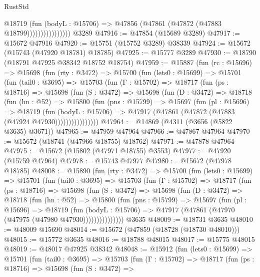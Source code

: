 \begin{lexlean}{RustStd}
\begin{coremodule}
                          @18719
                            (fun (bodyL : @15706) =>
                            @47856 (@47861 (@47872 (@47883 @18799))))))))))))))))
    @3289
@47916 := @47854 (@15689 @3289)
@47917 := @15672 @47916
@47920 := @15751 (@15752 @3289) @38339
@47924 := @15672 (@15743 (@47920 @18781) @18785)
@47925 := @15777 @3289
@47930 := @18790 (@18791 @47925 @38342 @18752 @18754)
@47959 := @15887
    (fun (rc : @15696) =>
    @15698
      (fun (rty : @3472) =>
      @15700
        (fun (lets0 : @15699) =>
        @15701
          (fun (tail0 : @3695) =>
          @15703
            (fun (Γ : @15702) =>
            @18717
              (fun (ps : @18716) =>
              @15698
                (fun (S : @3472) =>
                @15698
                  (fun (D : @3472) =>
                  @18718
                    (fun (hn : @52) =>
                    @15800
                      (fun (pns : @15799) =>
                      @15697
                        (fun (pl : @15696) =>
                        @18719
                          (fun (bodyL : @15706) =>
                          @47917 (@47861 (@47872 (@47883 (@47924 @47930))))))))))))))))
@47964 := @14869 (@4311 (@3656 (@5822 @3635) @3671))
@47965 := @47959 @47964
@47966 := @47867 @47964
@47970 := @15672 (@18741 (@47966 @18755) @18762)
@47971 := @47878 @47964
@47975 := @15672 (@15802 (@47971 @18755) @3553)
@47977 := @47920 (@15759 @47964)
@47978 := @15743 @47977
@47980 := @15672 (@47978 @18785)
@48008 := @15890
    (fun (rty : @3472) =>
    @15700
      (fun (lets0 : @15699) =>
      @15701
        (fun (tail0 : @3695) =>
        @15703
          (fun (Γ : @15702) =>
          @18717
            (fun (ps : @18716) =>
            @15698
              (fun (S : @3472) =>
              @15698
                (fun (D : @3472) =>
                @18718
                  (fun (hn : @52) =>
                  @15800
                    (fun (pns : @15799) =>
                    @15697
                      (fun (pl : @15696) =>
                      @18719
                        (fun (bodyL : @15706) =>
                        @47917 (@47861 (@47970 (@47975 (@47980 @47930)))))))))))))))
    @3635
@48009 := @18731 @3635
@48010 := @48009 @15690
@48014 := @15672 (@47859 (@18728 (@18730 @48010)))
@48015 := @15772 @3635
@48016 := @18788 @48015
@48017 := @15775 @48015
@48019 := @48017 @47925 @38342
@48048 := @15912
    (fun (lets0 : @15699) =>
    @15701
      (fun (tail0 : @3695) =>
      @15703
        (fun (Γ : @15702) =>
        @18717
          (fun (ps : @18716) =>
          @15698
            (fun (S : @3472) =>

\end{coremodule}
\end{lexlean}
